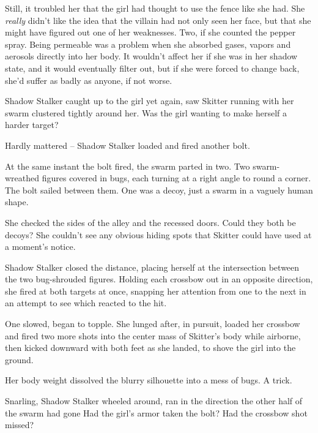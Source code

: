Still, it troubled her that the girl had thought to use the fence like she had.  She \emph{really }didn't like the idea that the villain had not only seen her face, but that she might have figured out one of her weaknesses.  Two, if she counted the pepper spray.  Being permeable was a problem when she absorbed gases, vapors and aerosols directly into her body.  It wouldn't affect her if she was in her shadow state, and it would eventually filter out, but if she were forced to change back, she'd suffer as badly as anyone, if not worse.



Shadow Stalker caught up to the girl yet again, saw Skitter running with her swarm clustered tightly around her.  Was the girl wanting to make herself a harder target?



Hardly mattered – Shadow Stalker loaded and fired another bolt.



At the same instant the bolt fired, the swarm parted in two.  Two swarm-wreathed figures covered in bugs, each turning at a right angle to round a corner.  The bolt sailed between them.  One was a decoy, just a swarm in a vaguely human shape.



She checked the sides of the alley and the recessed doors.  Could they both be decoys?  She couldn't see any obvious hiding spots that Skitter could have used at a moment's notice.



Shadow Stalker closed the distance, placing herself at the intersection between the two bug-shrouded figures.  Holding each crossbow out in an opposite direction, she fired at both targets at once, snapping her attention from one to the next in an attempt to see which reacted to the hit.



One slowed, began to topple.  She lunged after, in pursuit, loaded her crossbow and fired two more shots into the center mass of Skitter's body while airborne, then kicked downward with both feet as she landed, to shove the girl into the ground.



Her body weight dissolved the blurry silhouette into a mess of bugs.  A trick.



Snarling, Shadow Stalker wheeled around, ran in the direction the other half of the swarm had gone  Had the girl's armor taken the bolt?  Had the crossbow shot missed?



